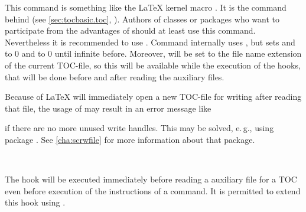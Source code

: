 \begin{Declaration}
\end{Declaration}
This command is something like the \LaTeX{} kernel macro
.  It is the
command behind  (see \autoref{sec:tocbasic.toc},
). Authors of classes or packages
who want to participate from the advantages of  should at
least use this command. Nevertheless it is recommended to use
. Command  internally uses
\Macro{\@starttoc}, but sets
 and  to 0
and  to 0 until infinite before. Moreover,
 will be set to
the file name extension of the current TOC-file, so this will be available
while the execution of the hooks, that will be done before and after reading
the auxiliary files.

Because of \LaTeX{} will immediately open a new TOC-file
for writing after reading that file, the usage of 
may result in an error message like
if there are no more unused write handles. This may be solved, e.\,g., using
package
.
See \autoref{cha:scrwfile} for more information about that package.%

\begin{Declaration}
  \\
\end{Declaration}
%
%
The hook  will be executed immediately before
reading a auxiliary file for a TOC even before execution of the instructions
of a  command. It is permitted to extend this hook
using .

